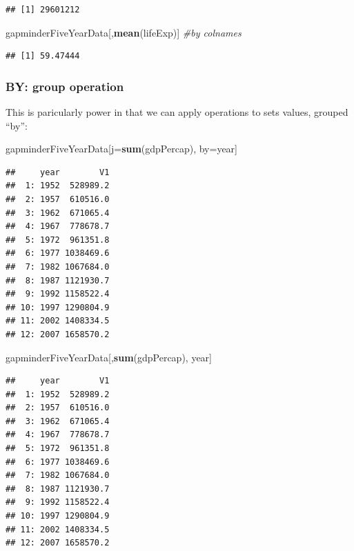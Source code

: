 \documentclass[]{article}
\newenvironment{Shaded}{\begin{snugshade}}{\end{snugshade}}
\newcommand{\KeywordTok}[1]{\textcolor[rgb]{0.13,0.29,0.53}{\textbf{{#1}}}}
\newcommand{\CommentTok}[1]{\textcolor[rgb]{0.56,0.35,0.01}{\textit{{#1}}}}
\newcommand{\NormalTok}[1]{{#1}}
\begin{document}
\begin{verbatim}
## [1] 29601212
\end{verbatim}

\begin{Shaded}
\begin{Highlighting}[]
\NormalTok{gapminderFiveYearData[,}\KeywordTok{mean}\NormalTok{(lifeExp)] }\CommentTok{#by colnames}
\end{Highlighting}
\end{Shaded}

\begin{verbatim}
## [1] 59.47444
\end{verbatim}

\subsubsection{BY: group operation}\label{by-group-operation}

This is paricularly power in that we can apply operations to sets
values, grouped ``by'':

\begin{Shaded}
\begin{Highlighting}[]
\NormalTok{gapminderFiveYearData[j=}\KeywordTok{sum}\NormalTok{(gdpPercap), by=year]}
\end{Highlighting}
\end{Shaded}

\begin{verbatim}
##     year        V1
##  1: 1952  528989.2
##  2: 1957  610516.0
##  3: 1962  671065.4
##  4: 1967  778678.7
##  5: 1972  961351.8
##  6: 1977 1038469.6
##  7: 1982 1067684.0
##  8: 1987 1121930.7
##  9: 1992 1158522.4
## 10: 1997 1290804.9
## 11: 2002 1408334.5
## 12: 2007 1658570.2
\end{verbatim}

\begin{Shaded}
\begin{Highlighting}[]
\NormalTok{gapminderFiveYearData[,}\KeywordTok{sum}\NormalTok{(gdpPercap), year]}
\end{Highlighting}
\end{Shaded}

\begin{verbatim}
##     year        V1
##  1: 1952  528989.2
##  2: 1957  610516.0
##  3: 1962  671065.4
##  4: 1967  778678.7
##  5: 1972  961351.8
##  6: 1977 1038469.6
##  7: 1982 1067684.0
##  8: 1987 1121930.7
##  9: 1992 1158522.4
## 10: 1997 1290804.9
## 11: 2002 1408334.5
## 12: 2007 1658570.2
\end{verbatim}
\end{document}
